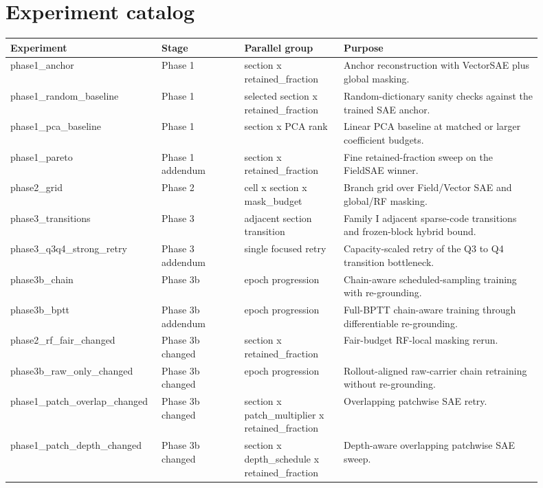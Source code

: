 \documentclass[11pt]{article}
\begin{document}
\section{Experiment catalog}
\begin{longtable}{p{0.21\linewidth}p{0.15\linewidth}p{0.18\linewidth}p{0.36\linewidth}}
\toprule
Experiment & Stage & Parallel group & Purpose \\
\midrule
\endhead
phase1\_anchor & Phase 1 & section x retained\_fraction & Anchor reconstruction with VectorSAE plus global masking. \\
phase1\_random\_baseline & Phase 1 & selected section x retained\_fraction & Random-dictionary sanity checks against the trained SAE anchor. \\
phase1\_pca\_baseline & Phase 1 & section x PCA rank & Linear PCA baseline at matched or larger coefficient budgets. \\
phase1\_pareto & Phase 1 addendum & section x retained\_fraction & Fine retained-fraction sweep on the FieldSAE winner. \\
phase2\_grid & Phase 2 & cell x section x mask\_budget & Branch grid over Field/Vector SAE and global/RF masking. \\
phase3\_transitions & Phase 3 & adjacent section transition & Family I adjacent sparse-code transitions and frozen-block hybrid bound. \\
phase3\_q3q4\_strong\_retry & Phase 3 addendum & single focused retry & Capacity-scaled retry of the Q3 to Q4 transition bottleneck. \\
phase3b\_chain & Phase 3b & epoch progression & Chain-aware scheduled-sampling training with re-grounding. \\
phase3b\_bptt & Phase 3b addendum & epoch progression & Full-BPTT chain-aware training through differentiable re-grounding. \\
phase2\_rf\_fair\_changed & Phase 3b changed & section x retained\_fraction & Fair-budget RF-local masking rerun. \\
phase3b\_raw\_only\_changed & Phase 3b changed & epoch progression & Rollout-aligned raw-carrier chain retraining without re-grounding. \\
phase1\_patch\_overlap\_changed & Phase 3b changed & section x patch\_multiplier x retained\_fraction & Overlapping patchwise SAE retry. \\
phase1\_patch\_depth\_changed & Phase 3b changed & section x depth\_schedule x retained\_fraction & Depth-aware overlapping patchwise SAE sweep. \\

\end{longtable}
\end{document}

